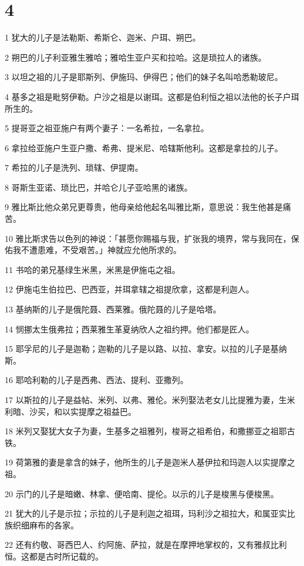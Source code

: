 \chapter{4}

\par 1 犹大的儿子是法勒斯、希斯仑、迦米、户珥、朔巴。
\par 2 朔巴的儿子利亚雅生雅哈；雅哈生亚户买和拉哈。这是琐拉人的诸族。
\par 3 以坦之祖的儿子是耶斯列、伊施玛、伊得巴；他们的妹子名叫哈悉勒玻尼。
\par 4 基多之祖是毗努伊勒。户沙之祖是以谢珥。这都是伯利恒之祖以法他的长子户珥所生的。
\par 5 提哥亚之祖亚施户有两个妻子：一名希拉，一名拿拉。
\par 6 拿拉给亚施户生亚户撒、希弗、提米尼、哈辖斯他利。这都是拿拉的儿子。
\par 7 希拉的儿子是洗列、琐辖、伊提南。
\par 8 哥斯生亚诺、琐比巴，并哈仑儿子亚哈黑的诸族。
\par 9 雅比斯比他众弟兄更尊贵，他母亲给他起名叫雅比斯，意思说：我生他甚是痛苦。
\par 10 雅比斯求告以色列的神说：「甚愿你赐福与我，扩张我的境界，常与我同在，保佑我不遭患难，不受艰苦。」神就应允他所求的。
\par 11 书哈的弟兄基绿生米黑，米黑是伊施屯之祖。
\par 12 伊施屯生伯拉巴、巴西亚，并珥拿辖之祖提欣拿，这都是利迦人。
\par 13 基纳斯的儿子是俄陀聂、西莱雅。俄陀聂的儿子是哈塔。
\par 14 悯挪太生俄弗拉；西莱雅生革夏纳欣人之祖约押。他们都是匠人。
\par 15 耶孚尼的儿子是迦勒；迦勒的儿子是以路、以拉、拿安。以拉的儿子是基纳斯。
\par 16 耶哈利勒的儿子是西弗、西法、提利、亚撒列。
\par 17 以斯拉的儿子是益帖、米列、以弗、雅伦。米列娶法老女儿比提雅为妻，生米利暗、沙买，和以实提摩之祖益巴。
\par 18 米列又娶犹大女子为妻，生基多之祖雅列，梭哥之祖希伯，和撒挪亚之祖耶古铁。
\par 19 荷第雅的妻是拿含的妹子，他所生的儿子是迦米人基伊拉和玛迦人以实提摩之祖。
\par 20 示门的儿子是暗嫩、林拿、便哈南、提伦。以示的儿子是梭黑与便梭黑。
\par 21 犹大的儿子是示拉；示拉的儿子是利迦之祖珥，玛利沙之祖拉大，和属亚实比族织细麻布的各家。
\par 22 还有约敬、哥西巴人、约阿施、萨拉，就是在摩押地掌权的，又有雅叔比利恒。这都是古时所记载的。

